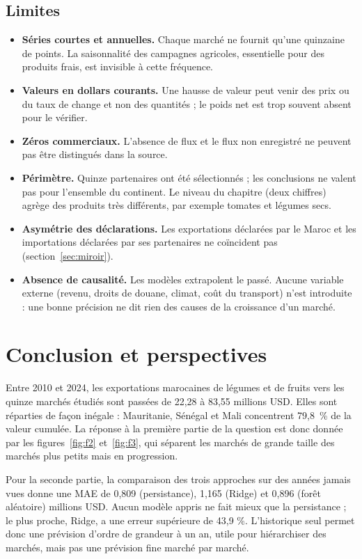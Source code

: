 \documentclass[11pt,a4paper]{article}
\begin{document}
\subsection{Limites}
\begin{itemize}
\item \textbf{Séries courtes et annuelles.} Chaque marché ne fournit qu'une quinzaine de points. La saisonnalité des campagnes agricoles, essentielle pour des produits frais, est invisible à cette fréquence.
\item \textbf{Valeurs en dollars courants.} Une hausse de valeur peut venir des prix ou du taux de change et non des quantités ; le poids net est trop souvent absent pour le vérifier.
\item \textbf{Zéros commerciaux.} L'absence de flux et le flux non enregistré ne peuvent pas être distingués dans la source.
\item \textbf{Périmètre.} Quinze partenaires ont été sélectionnés ; les conclusions ne valent pas pour l'ensemble du continent. Le niveau du chapitre (deux chiffres) agrège des produits très différents, par exemple tomates et légumes secs.
\item \textbf{Asymétrie des déclarations.} Les exportations déclarées par le Maroc et les importations déclarées par ses partenaires ne coïncident pas (section~\ref{sec:miroir}).
\item \textbf{Absence de causalité.} Les modèles extrapolent le passé. Aucune variable externe (revenu, droits de douane, climat, coût du transport) n'est introduite : une bonne précision ne dit rien des causes de la croissance d'un marché.
\end{itemize}

\section{Conclusion et perspectives}\label{sec:conclusion}
Entre 2010 et 2024, les exportations marocaines de légumes et de fruits vers les quinze marchés étudiés sont passées de 22,28 à 83,55 millions USD. Elles sont réparties de façon inégale : Mauritanie, Sénégal et Mali concentrent 79,8~\% de la valeur cumulée. La réponse à la première partie de la question est donc donnée par les figures~\ref{fig:f2} et~\ref{fig:f3}, qui séparent les marchés de grande taille des marchés plus petits mais en progression.

Pour la seconde partie, la comparaison des trois approches sur des années jamais vues donne une MAE de 0,809 (persistance), 1,165 (Ridge) et 0,896 (forêt aléatoire) millions USD. Aucun modèle appris ne fait mieux que la persistance ; le plus proche, Ridge, a une erreur supérieure de 43,9 \%. L'historique seul permet donc une prévision d'ordre de grandeur à un an, utile pour hiérarchiser des marchés, mais pas une prévision fine marché par marché.
\end{document}
